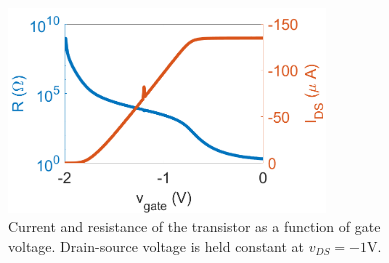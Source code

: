 \documentclass{article}
\begin{document}
\begin{figure}[H]
    \centering
    \includegraphics[width = 0.75\textwidth]{matlab_current_line.png}
    \caption{Current and resistance of the transistor as a function of gate voltage. Drain-source voltage is held constant at $v_{DS} = -1\si{\volt}$.}
    \label{fig:4wirecurrentline}
\end{figure}
\end{document}
